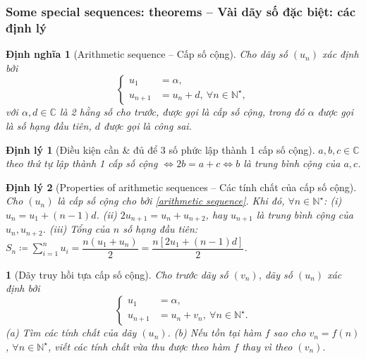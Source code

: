 \documentclass{article}
\newtheorem{baitoan}{}
\newtheorem{dinhly}{Định lý}
\newtheorem{dinhnghia}{Định nghĩa}
\begin{document}

\subsubsection{Some special sequences: theorems -- Vài dãy số đặc biệt: các định lý}

\begin{dinhnghia}[Arithmetic sequence -- Cấp số cộng]
	Cho dãy số $(u_n)$ xác định bởi
	\begin{equation}
		\label{arithmetic sequence}
		\tag{csc}
		\left\{\begin{split}
			u_1 &= \alpha,\\
			u_{n+1} &= u_n + d,\ \forall n\in\mathbb{N}^\star,
		\end{split}\right.
	\end{equation}
	với $\alpha,d\in\mathbb{C}$ là 2 hằng số cho trước, được gọi là {\rm cấp số cộng}, trong đó $\alpha$ được gọi là {\rm số hạng đầu tiên}, $d$ được gọi là {\rm công sai}.
\end{dinhnghia}

\begin{dinhly}[Điều kiện cần \& đủ để 3 số phức lập thành 1 cấp số cộng]
	$a,b,c\in\mathbb{C}$ theo thứ tự lập thành 1 cấp số cộng $\Leftrightarrow2b = a + c\Leftrightarrow b$ là trung bình cộng của $a,c$.
\end{dinhly}

\begin{dinhly}[Properties of arithmetic sequences -- Các tính chất của cấp số cộng]
	\label{thm: properties of arithmetic sequences}
	Cho $(u_n)$ là cấp số cộng cho bởi \eqref{arithmetic sequence}. Khi đó, $\forall n\in\mathbb{N}^\star$: (i) $u_n = u_1 + (n - 1)d$. (ii) $2u_{n+1} = u_n + u_{n+2}$, hay $u_{n+1}$ là trung bình cộng của $u_n,u_{n+2}$. (iii) Tổng của $n$ số hạng đầu tiên: $S_n\coloneqq\sum_{i=1}^n u_i = \dfrac{n(u_1 + u_n)}{2} = \dfrac{n[2u_1 + (n - 1)d]}{2}$.
\end{dinhly}

\begin{baitoan}[Dãy truy hồi tựa cấp số cộng]
	Cho trước dãy số $(v_n)$, dãy số $(u_n)$ xác định bởi
	\begin{equation*}
		\left\{\begin{split}
			u_1 &= \alpha,\\
			u_{n+1} &= u_n + v_n,\ \forall n\in\mathbb{N}^\star.
		\end{split}\right.
	\end{equation*}
	(a) Tìm các tính chất của dãy $(u_n)$. (b) Nếu tồn tại hàm $f$ sao cho $v_n = f(n)$, $\forall n\in\mathbb{N}^\star$, viết các tính chất vừa thu được theo hàm $f$ thay vì theo $(v_n)$.
\end{baitoan}
\end{document}
